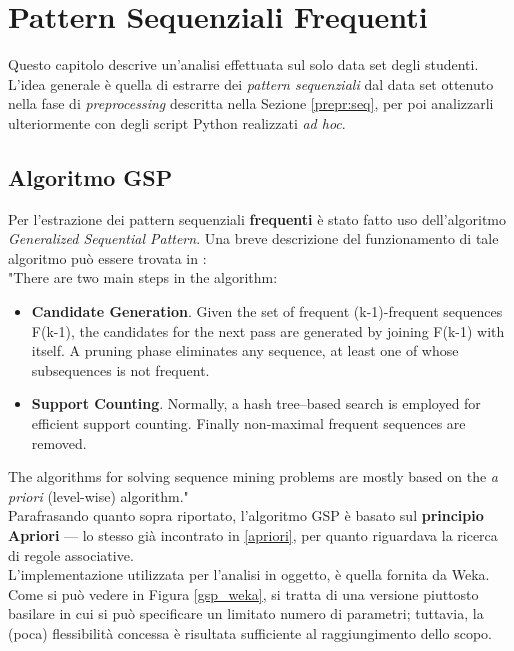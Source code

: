 \chapter{Pattern Sequenziali Frequenti}
\label{ch:seq}

Questo capitolo descrive un'analisi effettuata sul solo data set degli studenti. L'idea generale è quella di estrarre dei \textit{pattern sequenziali} dal data set ottenuto nella fase di \textit{preprocessing} descritta nella Sezione \ref{prepr:seq}, per poi analizzarli ulteriormente con degli script Python realizzati \textit{ad hoc}.

\section{Algoritmo GSP}

    Per l'estrazione dei pattern sequenziali \textbf{frequenti} è stato fatto uso dell'algoritmo \textit{Generalized Sequential Pattern}. Una breve descrizione del funzionamento di tale algoritmo può essere trovata in \cite{gsp}: \\

    "There are two main steps in the algorithm:
    \begin{itemize}
        \item \textbf{Candidate Generation}. Given the set of frequent (k-1)-frequent sequences F(k-1), the candidates for the next pass are generated by joining F(k-1) with itself. A pruning phase eliminates any sequence, at least one of whose subsequences is not frequent.
        \item \textbf{Support Counting}. Normally, a hash tree–based search is employed for efficient support counting. Finally non-maximal frequent sequences are removed.
    \end{itemize}

    The algorithms for solving sequence mining problems are mostly based on the \textit{a priori} (level-wise) algorithm." \\

    Parafrasando quanto sopra riportato, l'algoritmo GSP è basato sul \textbf{principio Apriori} --- lo stesso già incontrato in \ref{apriori}, per quanto riguardava la ricerca di regole associative. \\

    L'implementazione utilizzata per l'analisi in oggetto, è quella fornita da Weka. Come si può vedere in Figura \ref{gsp_weka}, si tratta di una versione piuttosto basilare in cui si può specificare un limitato numero di parametri; tuttavia, la (poca) flessibilità concessa è risultata sufficiente al raggiungimento dello scopo.

